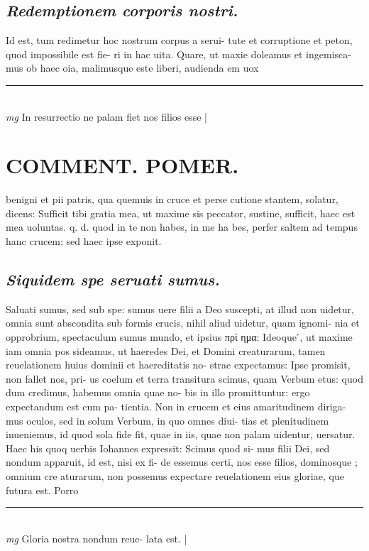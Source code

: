 \documentclass{article}
\begin{document}
\begin{pages}
\subsection*{\textit{Redemptionem corporis nostri. }}\pstart Id est, tum redimetur hoc nostrum corpus a serui- tute et corruptione et peton, quod impossibile est fie- ri in hac uita. Quare, ut maxie doleamus et ingemisca- mus ob haec oia, malimusque este liberi, audienda em uox  \pend
\vspace{0.5cm}\noindent
\vspace{0.2cm}\rule{1cm}{0.2pt}\\ 
\hspace{0.2cm}\textit{mg}
\footnotesize In resurrectio ne palam fiet nos filios esse 
\normalsize| 
\section*{COMMENT. POMER.  }\pstart benigni et pii patris, qua quemuis in cruce et perse cutione stantem, solatur, dicens: Sufficit tibi gratia mea, ut maxime sis peccator, sustine, sufficit, haec est mea uoluntas. q. d. quod in te non habes, in me ha bes, perfer saltem ad tempus hanc crucem: sed haec ipse exponit.  \pend
{}
{}
\subsection*{\textit{Siquidem spe seruati sumus. }}\pstart Saluati sumus, sed sub spe: sumus uere filii a Deo suscepti, at illud non uidetur, omnia sunt abscondita sub formis crucis, nihil aliud uidetur, quam ignomi- nia et opprobrium, spectaculum sumus mundo, et ipsius πρί ημα: Ideoque ́, ut maxime iam omnia pos sideamus, ut haeredes Dei, et Domini creaturarum, tamen reuelationem huius dominii et haereditatis no- strae expectamus: Ipse promisit, non fallet nos, pri- us coelum et terra transitura scimus, quam Verbum etus: quod dum credimus, habemus omnia quae no- bis in illo promittuntur: ergo expectandum est cum pa- tientia. Non in crucem et eius amaritudinem diriga- mus oculos, sed in solum Verbum, in quo omnes diui- tias et plenitudinem inueniemus, id quod sola fide fit, quae in iis, quae non palam uidentur, uersatur. Haec his quoq uerbis Iohannes expressit: Scimus quod si- mus filii Dei, sed nondum apparuit, id est, nisi ex fi- de essemus certi, nos esse filios, dominosque ; omnium cre aturarum, non possemus expectare reuelationem eius gloriae, que futura est.  Porro  \pend
\vspace{0.5cm}\noindent
\vspace{0.2cm}\rule{1cm}{0.2pt}\\ 
\hspace{0.2cm}\textit{mg}
\footnotesize Gloria nostra nondum reue- lata est.  
\normalsize| 

\end{pages}
\end{document}
